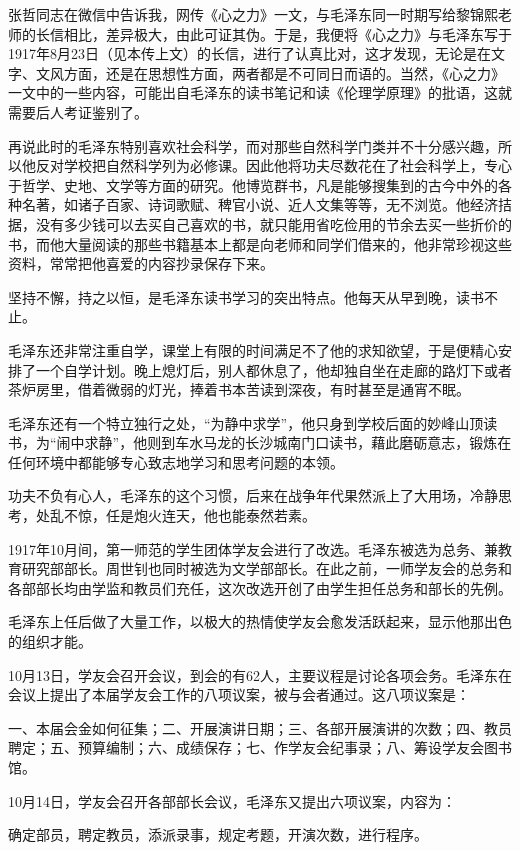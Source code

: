 \documentclass[../../dazhuan.tex]{subfiles}
\begin{document}
张哲同志在微信中告诉我，网传《心之力》一文，与毛泽东同一时期写给黎锦熙老师的长信相比，差异极大，由此可证其伪。于是，我便将《心之力》与毛泽东写于1917年8月23日（见本传上文）的长信，进行了认真比对，这才发现，无论是在文字、文风方面，还是在思想性方面，两者都是不可同日而语的。当然，《心之力》一文中的一些内容，可能出自毛泽东的读书笔记和读《伦理学原理》的批语，这就需要后人考证鉴别了。

再说此时的毛泽东特别喜欢社会科学，而对那些自然科学门类并不十分感兴趣，所以他反对学校把自然科学列为必修课。因此他将功夫尽数花在了社会科学上，专心于哲学、史地、文学等方面的研究。他博览群书，凡是能够搜集到的古今中外的各种名著，如诸子百家、诗词歌赋、稗官小说、近人文集等等，无不浏览。他经济拮据，没有多少钱可以去买自己喜欢的书，就只能用省吃俭用的节余去买一些折价的书，而他大量阅读的那些书籍基本上都是向老师和同学们借来的，他非常珍视这些资料，常常把他喜爱的内容抄录保存下来。

坚持不懈，持之以恒，是毛泽东读书学习的突出特点。他每天从早到晚，读书不止。

毛泽东还非常注重自学，课堂上有限的时间满足不了他的求知欲望，于是便精心安排了一个自学计划。晚上熄灯后，别人都休息了，他却独自坐在走廊的路灯下或者茶炉房里，借着微弱的灯光，捧着书本苦读到深夜，有时甚至是通宵不眠。

毛泽东还有一个特立独行之处，“为静中求学”，他只身到学校后面的妙峰山顶读书，为“闹中求静”，他则到车水马龙的长沙城南门口读书，藉此磨砺意志，锻炼在任何环境中都能够专心致志地学习和思考问题的本领。

功夫不负有心人，毛泽东的这个习惯，后来在战争年代果然派上了大用场，冷静思考，处乱不惊，任是炮火连天，他也能泰然若素。

1917年10月间，第一师范的学生团体学友会进行了改选。毛泽东被选为总务、兼教育研究部部长。周世钊也同时被选为文学部部长。在此之前，一师学友会的总务和各部部长均由学监和教员们充任，这次改选开创了由学生担任总务和部长的先例。

毛泽东上任后做了大量工作，以极大的热情使学友会愈发活跃起来，显示他那出色的组织才能。

10月13日，学友会召开会议，到会的有62人，主要议程是讨论各项会务。毛泽东在会议上提出了本届学友会工作的八项议案，被与会者通过。这八项议案是：

一、本届会金如何征集；二、开展演讲日期；三、各部开展演讲的次数；四、教员聘定；五、预算编制；六、成绩保存；七、作学友会纪事录；八、筹设学友会图书馆。

10月14日，学友会召开各部部长会议，毛泽东又提出六项议案，内容为：

确定部员，聘定教员，添派录事，规定考题，开演次数，进行程序。
\end{document}
